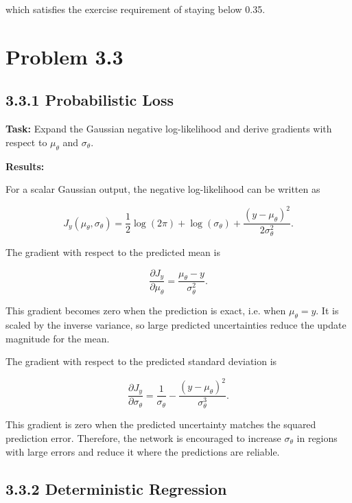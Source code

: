 \documentclass{article}
\begin{document}
which satisfies the exercise requirement of staying below 0.35.


\section*{Problem 3.3}

\subsection*{3.3.1 Probabilistic Loss}

\textbf{Task:} Expand the Gaussian negative log-likelihood and derive gradients with respect to \(\mu_\theta\) and \(\sigma_\theta\).

\vspace{0.3cm}

\textbf{Results:}

For a scalar Gaussian output, the negative log-likelihood can be written as

\[
J_y(\mu_\theta,\sigma_\theta)
=
\frac{1}{2}\log(2\pi)
+
\log(\sigma_\theta)
+
\frac{(y-\mu_\theta)^2}{2\sigma_\theta^2}.
\]

The gradient with respect to the predicted mean is

\[
\frac{\partial J_y}{\partial \mu_\theta}
=
\frac{\mu_\theta-y}{\sigma_\theta^2}.
\]

This gradient becomes zero when the prediction is exact, i.e. when \(\mu_\theta = y\). It is scaled by the inverse variance, so large predicted uncertainties reduce the update magnitude for the mean.

The gradient with respect to the predicted standard deviation is

\[
\frac{\partial J_y}{\partial \sigma_\theta}
=
\frac{1}{\sigma_\theta}
-
\frac{(y-\mu_\theta)^2}{\sigma_\theta^3}.
\]

This gradient is zero when the predicted uncertainty matches the squared prediction error. Therefore, the network is encouraged to increase \(\sigma_\theta\) in regions with large errors and reduce it where the predictions are reliable.


\subsection*{3.3.2 Deterministic Regression}
\end{document}
